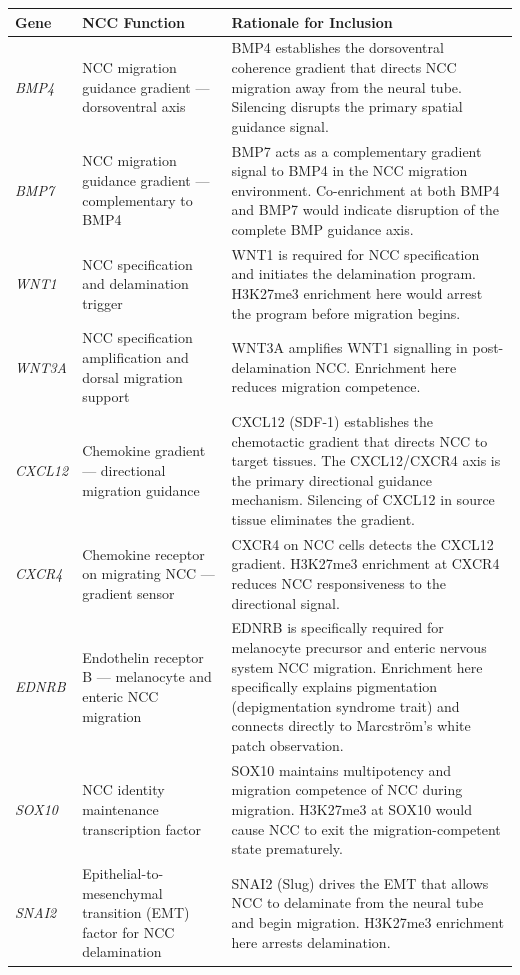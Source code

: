 \documentclass[10pt, a4paper]{article}
\begin{document}
\begin{mdframed}[
  backgroundcolor=locusbox,
  linecolor=headergreen,
  linewidth=0.8pt,
  innertopmargin=0.5em,
  innerbottommargin=0.5em,
  innerleftmargin=0.8em,
  innerrightmargin=0.8em
]
\small
\begin{longtable}{p{2.0cm}p{4.5cm}p{6.0cm}}
\toprule
\textbf{Gene} &
\textbf{NCC Function} &
\textbf{Rationale for Inclusion} \\
\midrule
\textit{BMP4} &
NCC migration guidance gradient ---
dorsoventral axis &
BMP4 establishes the dorsoventral coherence
gradient that directs NCC migration away from
the neural tube. Silencing disrupts the
primary spatial guidance signal. \\[0.3em]
\textit{BMP7} &
NCC migration guidance gradient ---
complementary to BMP4 &
BMP7 acts as a complementary gradient signal
to BMP4 in the NCC migration environment.
Co-enrichment at both BMP4 and BMP7 would
indicate disruption of the complete BMP
guidance axis. \\[0.3em]
\textit{WNT1} &
NCC specification and
delamination trigger &
WNT1 is required for NCC specification and
initiates the delamination program. H3K27me3
enrichment here would arrest the program
before migration begins. \\[0.3em]
\textit{WNT3A} &
NCC specification amplification
and dorsal migration support &
WNT3A amplifies WNT1 signalling in
post-delamination NCC. Enrichment
here reduces migration competence. \\[0.3em]
\textit{CXCL12} &
Chemokine gradient --- directional
migration guidance &
CXCL12 (SDF-1) establishes the chemotactic
gradient that directs NCC to target tissues.
The CXCL12/CXCR4 axis is the primary
directional guidance mechanism.
Silencing of CXCL12 in source tissue
eliminates the gradient. \\[0.3em]
\textit{CXCR4} &
Chemokine receptor on migrating NCC ---
gradient sensor &
CXCR4 on NCC cells detects the CXCL12
gradient. H3K27me3 enrichment at CXCR4
reduces NCC responsiveness to the
directional signal. \\[0.3em]
\textit{EDNRB} &
Endothelin receptor B ---
melanocyte and enteric NCC migration &
EDNRB is specifically required for
melanocyte precursor and enteric nervous
system NCC migration. Enrichment here
specifically explains pigmentation
(depigmentation syndrome trait) and
connects directly to Marcstr\"{o}m's
white patch observation. \\[0.3em]
\textit{SOX10} &
NCC identity maintenance transcription
factor &
SOX10 maintains multipotency and migration
competence of NCC during migration.
H3K27me3 at SOX10 would cause NCC to
exit the migration-competent state
prematurely. \\[0.3em]
\textit{SNAI2} &
Epithelial-to-mesenchymal transition
(EMT) factor for NCC delamination &
SNAI2 (Slug) drives the EMT that allows
NCC to delaminate from the neural tube
and begin migration. H3K27me3 enrichment
here arrests delamination. \\
\bottomrule
\end{longtable}
\end{mdframed}
\end{document}

